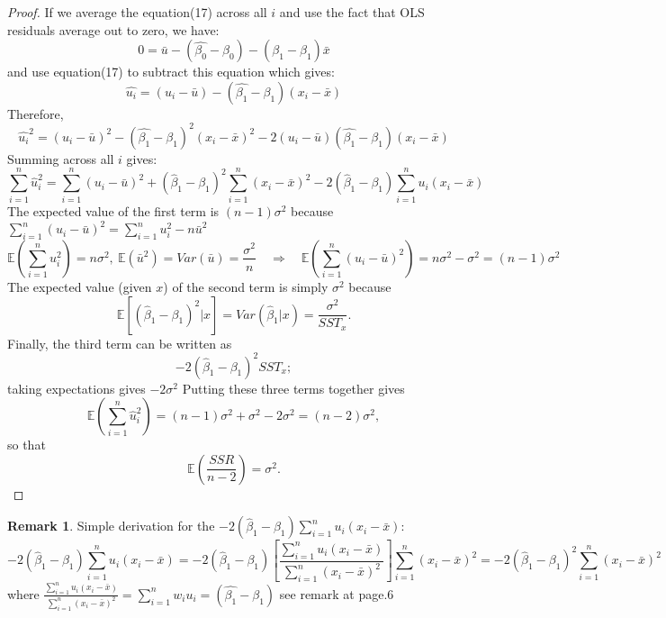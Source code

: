 \documentclass[a4paper, 10pt]{article}
\theoremstyle{definition}	%
\newtheorem*{remark}{Remark}
\begin{document}
\begin{proof}
    If we average the equation(17) across all $i$ and use the fact that OLS residuals average out to zero, we have:
    \begin{equation*}
        0 = \bar{u} -(\hat{\beta_0} - \beta_0) - (\hat{\beta_1} - \beta_1)\bar{x}
    \end{equation*}
    and use equation(17) to subtract this equation which gives:
    \begin{equation*}
        \hat{u_i} = (u_i - \bar{u}) - (\hat{\beta_1} - \beta_1)(x_i - \bar{x})
    \end{equation*}
    Therefore, 
    \begin{equation*}
        \hat{u_i}^2 = (u_i - \bar{u})^2 - (\hat{\beta_1} - \beta_1)^2(x_i - \bar{x})^2 -2(u_i - \bar{u})(\hat{\beta_1} - \beta_1)(x_i - \bar{x})
    \end{equation*}
    Summing across all $i$ gives:
    \begin{equation*}
        \sum_{i=1}^{n} \hat{u}_i^2 = \sum_{i=1}^{n} (u_i - \bar{u})^2 + (\hat{\beta}_1 - \beta_1)^2 
        \sum_{i=1}^{n} (x_i - \bar{x})^2 - 2 (\hat{\beta}_1 - \beta_1) \sum_{i=1}^{n} u_i(x_i - \bar{x})
    \end{equation*}
    The expected value of the first term is \((n - 1) \sigma^2\) because $\sum_{i=1}^{n} (u_i - \bar{u})^2 = \sum_{i=1}^{n} u_i^2 - n \bar{u}^2$
    \[
    \mathbb{E}\left( \sum_{i=1}^{n} u_i^2 \right) = n \sigma^2,\  \mathbb{E}(\bar{u}^2) = Var(\bar{u}) = \frac{\sigma^2}{n} \quad \Rightarrow \quad \mathbb{E}\left( \sum_{i=1}^{n} (u_i - \bar{u})^2 \right) = n \sigma^2 - \sigma^2 = (n - 1) \sigma^2
    \]
    The expected value (given $x$) of the second term is simply \(\sigma^2\) because 
    \[
    \mathbb{E}\left[(\hat{\beta}_1 - \beta_1)^2|x\right] = Var(\hat{\beta}_1|x) = \frac{\sigma^2}{SST_x}. 
    \]
    Finally, the third term can be written as
    \[
    -2 (\hat{\beta}_1 - \beta_1)^2 SST_x;
    \]
    taking expectations gives \(-2 \sigma^2\)
    Putting these three terms together gives
    \[
    \mathbb{E} \left( \sum_{i=1}^{n} \hat{u}_i^2 \right) = (n - 1) \sigma^2 + \sigma^2 - 2 \sigma^2 = (n - 2) \sigma^2,
    \]
    so that
    \[
    \mathbb{E} \left( \frac{SSR}{n - 2} \right) = \sigma^2.
    \]
\end{proof}
\begin{remark}
    Simple derivation for the $-2 (\hat{\beta}_1 - \beta_1) \sum_{i=1}^{n} u_i(x_i - \bar{x})$:
    \begin{equation*}
        -2 (\hat{\beta}_1 - \beta_1) \sum_{i=1}^{n} u_i(x_i - \bar{x}) = -2 (\hat{\beta}_1 - \beta_1) \left[\frac{\sum_{i=1}^{n} u_i(x_i - \bar{x})}{\sum_{i=1}^{n} \left(x_i - \bar{x}\right)^2}\right] \sum_{i=1}^{n} \left(x_i - \bar{x}\right)^2 = -2 (\hat{\beta}_1 - \beta_1)^2 \sum_{i=1}^{n} \left(x_i - \bar{x}\right)^2
    \end{equation*}  
    where $\frac{\sum_{i=1}^{n} u_i(x_i - \bar{x})}{\sum_{i=1}^{n} \left(x_i - \bar{x}\right)^2} = \sum_{i=1}^{n}w_i u_i = (\hat{\beta_1} - \beta_1) $ see remark at page.6
\end{remark}
\end{document}
